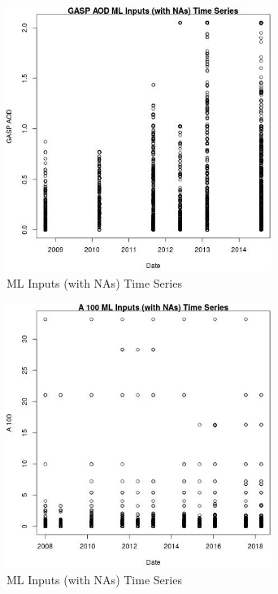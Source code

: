 \begin{figure} 
\centering  
\includegraphics[width=0.77\textwidth]{Code_Outputs/Report_ML_input_PM25_Step4_part_e_de_duplicated_aves_compiled_2019-05-18wNAs_GASP_AODvDate.jpg} 
\caption{\label{fig:Report_ML_input_PM25_Step4_part_e_de_duplicated_aves_compiled_2019-05-18wNAsGASP_AODvDate}ML Inputs (with NAs) Time Series} 
\end{figure} 
 

\clearpage 

\begin{figure} 
\centering  
\includegraphics[width=0.77\textwidth]{Code_Outputs/Report_ML_input_PM25_Step4_part_e_de_duplicated_aves_compiled_2019-05-18wNAs_A_100vDate.jpg} 
\caption{\label{fig:Report_ML_input_PM25_Step4_part_e_de_duplicated_aves_compiled_2019-05-18wNAsA_100vDate}ML Inputs (with NAs) Time Series} 
\end{figure} 
 

